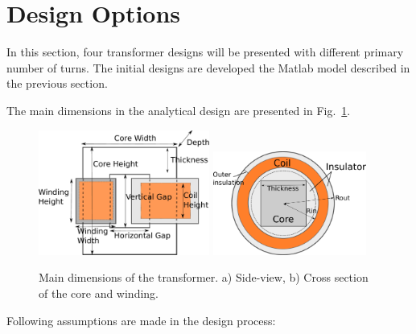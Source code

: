 \documentclass[a4paper, 11pt]{article} %
\begin{document}
\section{Design Options}

In this section, four transformer designs will be presented with different primary number of turns. The initial designs are developed the Matlab model described in the previous section.

The main dimensions in the analytical design are presented in Fig.~\ref{transformer_dimensions}.

\begin{figure}[]
  \centering
    \includegraphics[width=0.5\textwidth]{transformer_dimensions}
   \includegraphics[width=0.45\textwidth]{transformer_dimensions_cross_section}
  \caption{Main dimensions of the transformer. a) Side-view, b) Cross section of the core and winding.}
  \label{transformer_dimensions}
\end{figure}

Following assumptions are made in the design process:
\end{document}
